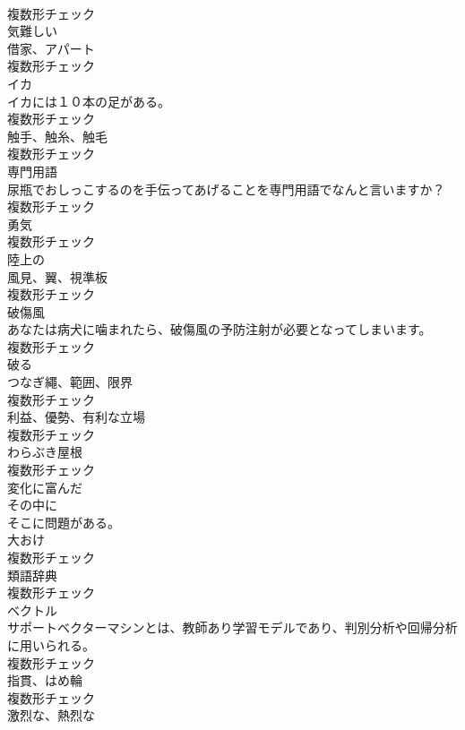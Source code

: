 \documentclass[8pt]{extreport}
\begin{document}
\begin{CJK}{UTF8}{min}
\\	複数形チェック
\\	[形容詞]	気難しい	
\\	[名詞]	借家、アパート	
\\	複数形チェック
\\	[名詞]	イカ	
\\	イカには１０本の足がある。	
\\	複数形チェック
\\	[名詞]	触手、触糸、触毛	
\\	複数形チェック
\\	[名詞]	専門用語	
\\	尿瓶でおしっこするのを手伝ってあげることを専門用語でなんと言いますか？	
\\	複数形チェック
\\	[名詞]	勇気	
\\	複数形チェック
\\	[形容詞]	陸上の	
\\	[名詞]	風見、翼、視準板	
\\	複数形チェック
\\	[名詞]	破傷風	
\\	あなたは病犬に噛まれたら、破傷風の予防注射が必要となってしまいます。	
\\	複数形チェック
\\	[動詞]	破る	
\\	[名詞]	つなぎ繩、範囲、限界	
\\	複数形チェック
\\	[名詞]	利益、優勢、有利な立場	
\\	複数形チェック
\\	[名詞]	わらぶき屋根	
\\	複数形チェック
\\	[形容詞]	変化に富んだ	
\\	[副詞]	その中に	
\\	そこに問題がある。	
\\	[名詞]	大おけ	
\\	複数形チェック
\\	[名詞]	類語辞典	
\\	複数形チェック
\\	[名詞]	ベクトル	
\\	サポートベクターマシンとは、教師あり学習モデルであり、判別分析や回帰分析に用いられる。	
\\	複数形チェック
\\	[名詞]	指貫、はめ輪	
\\	複数形チェック
\\	[形容詞]	激烈な、熱烈な	

\end{CJK}
\end{document}

